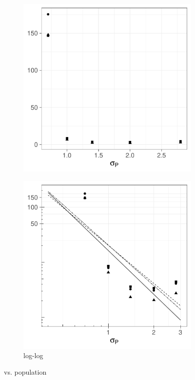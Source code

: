 \begin{figure}[htbp]
    \begin{subfigure}[t]{0.49\textwidth}
        \includegraphics[width=\textwidth]{results/by_population_spread/NMISE-vs-population-spread}
        \caption{}
        \label{fig:ise:pop_spread:nmise}
    \end{subfigure}
    \begin{subfigure}[t]{0.49\textwidth}
        \includegraphics[width=\textwidth]{results/by_population_spread/NMISE-vs-population-spread-log-log}
        \caption{ log-log}
        \label{fig:ise:pop_spread:nmise_log_log}
    \end{subfigure}
    \caption[: by population ]{ vs. population }
    \label{fig:ise:pop_spread}
\end{figure}

